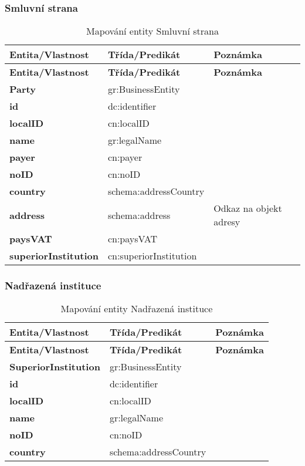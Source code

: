 \subsubsection*{Smluvní strana}

\begin{center}
\begin{longtable}{lp{30mm}p{65mm}}
\label{grid_mlmmh} \\
\multicolumn{1}{l}{\textbf{Entita/Vlastnost}} & 
\multicolumn{1}{l}{\textbf{Třída/Predikát}} & 
\multicolumn{1}{l}{\textbf{Poznámka}} \\ \hline 
\endfirsthead
\multicolumn{1}{l}{\textbf{Entita/Vlastnost}} & 
\multicolumn{1}{l}{\textbf{Třída/Predikát}} & 
\multicolumn{1}{l}{\textbf{Poznámka}} \\ \hline 
\hline
\endhead
\endfoot
\caption{Mapování entity Smluvní strana}
\endlastfoot
\textbf{Party} & gr:BusinessEntity \\
\textbf{id} & dc:identifier \\
\textbf{localID} & cn:localID \\
\textbf{name} & gr:legalName \\
\textbf{payer} & cn:payer \\
\textbf{noID} & cn:noID \\
\textbf{country} & schema:addressCountry \\
\textbf{address} & schema:address & Odkaz na objekt adresy \\
\textbf{paysVAT} & cn:paysVAT \\
\textbf{superiorInstitution} & cn:superiorInstitution \\
\end{longtable}
\end{center}

\newpage

\subsubsection*{Nadřazená instituce}

\begin{center}
\begin{longtable}{lp{30mm}p{65mm}}
\label{grid_mlmmh} \\
\multicolumn{1}{l}{\textbf{Entita/Vlastnost}} & 
\multicolumn{1}{l}{\textbf{Třída/Predikát}} & 
\multicolumn{1}{l}{\textbf{Poznámka}} \\ \hline 
\endfirsthead
\multicolumn{1}{l}{\textbf{Entita/Vlastnost}} & 
\multicolumn{1}{l}{\textbf{Třída/Predikát}} & 
\multicolumn{1}{l}{\textbf{Poznámka}} \\ \hline 
\hline
\endhead
\endfoot
\caption{Mapování entity Nadřazená instituce}
\endlastfoot
\textbf{SuperiorInstitution} & gr:BusinessEntity & \\
\textbf{id} & dc:identifier \\
\textbf{localID} & cn:localID \\
\textbf{name} & gr:legalName \\
\textbf{noID} & cn:noID \\
\textbf{country} & schema:addressCountry \\
\end{longtable}
\end{center}

